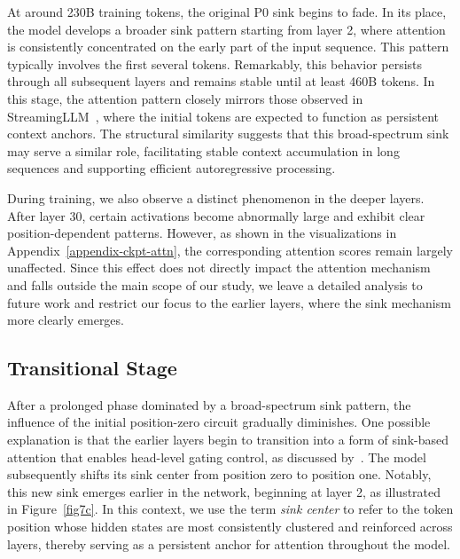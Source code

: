 \documentclass[]{template}
\theoremstyle{plain}
\theoremstyle{definition}
\theoremstyle{remark}
\begin{document}
At around 230B training tokens, the original P0 sink begins to fade. In its place, the model develops a broader sink pattern starting from layer 2, where attention is consistently concentrated on the early part of the input sequence. This pattern typically involves the first several tokens. Remarkably, this behavior persists through all subsequent layers and remains stable until at least 460B tokens.
In this stage, the attention pattern closely mirrors those observed in StreamingLLM~\citep{xiao2024efficientstreaminglanguagemodels}, where the initial tokens are expected to function as persistent context anchors. The structural similarity suggests that this broad-spectrum sink may serve a similar role, facilitating stable context accumulation in long sequences and supporting efficient autoregressive processing.


During training, we also observe a distinct phenomenon in the deeper layers. After layer 30, certain activations become abnormally large and exhibit clear position-dependent patterns. However, as shown in the visualizations in Appendix~\ref{appendix-ckpt-attn}, the corresponding attention scores remain largely unaffected. 
Since this effect does not directly impact the attention mechanism and falls outside the main scope of our study, we leave a detailed analysis to future work and restrict our focus to the earlier layers, where the sink mechanism more clearly emerges.

\subsection{Transitional Stage}

After a prolonged phase dominated by a broad-spectrum sink pattern, the influence of the initial position-zero circuit gradually diminishes. One possible explanation is that the earlier layers begin to transition into a form of sink-based attention that enables head-level gating control, as discussed by~\citet{sandovalsegura2025identifyingevaluatinginactiveheads}. The model subsequently shifts its sink center from position zero to position one. Notably, this new sink emerges earlier in the network, beginning at layer 2, as illustrated in Figure~\ref{fig7c}. In this context, we use the term \textit{sink center} to refer to the token position whose hidden states are most consistently clustered and reinforced across layers, thereby serving as a persistent anchor for attention throughout the model.
\end{document}
